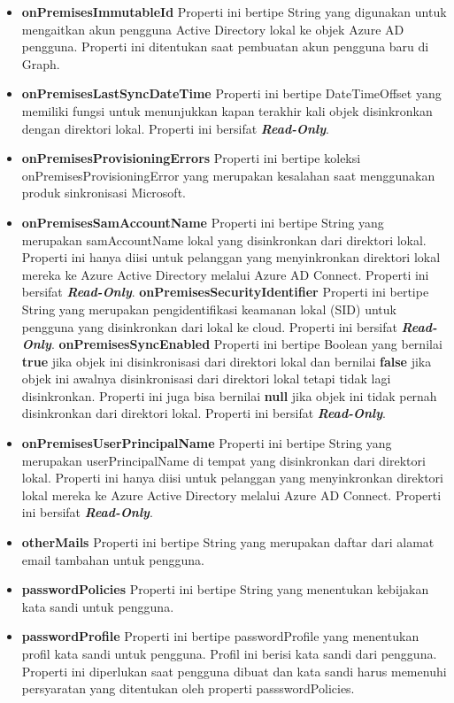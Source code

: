 \begin{itemize}
	\item \textbf{onPremisesImmutableId}
	Properti ini bertipe String yang digunakan untuk mengaitkan akun pengguna Active Directory lokal ke objek Azure AD pengguna. Properti ini ditentukan saat pembuatan akun pengguna baru di Graph.
	\item \textbf{onPremisesLastSyncDateTime}
	Properti ini bertipe DateTimeOffset yang memiliki fungsi untuk menunjukkan kapan terakhir kali objek disinkronkan dengan direktori lokal. Properti ini bersifat \textbf{\textit{Read-Only}}. 
	\item \textbf{onPremisesProvisioningErrors}
	Properti ini bertipe koleksi onPremisesProvisioningError yang merupakan kesalahan saat menggunakan produk sinkronisasi Microsoft.
	 \item \textbf{onPremisesSamAccountName}
	Properti ini bertipe String yang merupakan samAccountName lokal yang disinkronkan dari direktori lokal. Properti ini hanya diisi untuk pelanggan yang menyinkronkan direktori lokal mereka ke Azure Active Directory melalui Azure AD Connect. Properti ini bersifat \textbf{\textit{Read-Only}}.
	\textbf{onPremisesSecurityIdentifier}
	Properti ini bertipe String yang merupakan pengidentifikasi keamanan lokal (SID) untuk pengguna yang disinkronkan dari lokal ke cloud. Properti ini bersifat \textbf{\textit{Read-Only}}.
	\textbf{onPremisesSyncEnabled}
	Properti ini bertipe Boolean yang bernilai \textbf{true} jika objek ini disinkronisasi dari direktori lokal dan bernilai \textbf{false} jika objek ini awalnya disinkronisasi dari direktori lokal tetapi tidak lagi disinkronkan. Properti ini juga bisa bernilai \textbf{null} jika objek ini tidak pernah disinkronkan dari direktori lokal. Properti ini bersifat \textbf{\textit{Read-Only}}.
	\item \textbf{onPremisesUserPrincipalName}
	Properti ini bertipe String yang merupakan userPrincipalName di tempat yang disinkronkan dari direktori lokal. Properti ini hanya diisi untuk pelanggan yang menyinkronkan direktori lokal mereka ke Azure Active Directory melalui Azure AD Connect. Properti ini bersifat \textbf{\textit{Read-Only}}.
	\item \textbf{otherMails}
	Properti ini bertipe String yang merupakan daftar dari alamat email tambahan untuk pengguna.
	\item \textbf{passwordPolicies}
	Properti ini bertipe String yang menentukan kebijakan kata sandi untuk pengguna. 
	\item \textbf{passwordProfile}
	Properti ini bertipe passwordProfile yang menentukan profil kata sandi untuk pengguna. Profil ini berisi kata sandi dari pengguna. Properti ini diperlukan saat pengguna dibuat dan kata sandi harus memenuhi persyaratan yang ditentukan oleh properti passswordPolicies.

\end{itemize}
